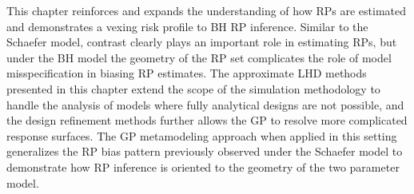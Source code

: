 
This chapter reinforces and expands the understanding of how RPs are estimated
and demonstrates a vexing risk profile to BH RP inference.
%
Similar to the Schaefer model, contrast clearly plays an important role in 
estimating RPs, but under the BH model the geometry of the RP set complicates 
the role of model misspecification in biasing RP estimates. 
The approximate LHD methods presented in this chapter extend the scope of the 
simulation methodology to handle the analysis of models where fully analytical 
designs are not possible, and the design refinement methods further allows the GP 
to resolve more complicated response surfaces. %
The GP metamodeling approach when applied in this setting generalizes the RP 
bias pattern previously observed under the Schaefer model to demonstrate how 
RP inference is oriented to the geometry of the two parameter model.  




